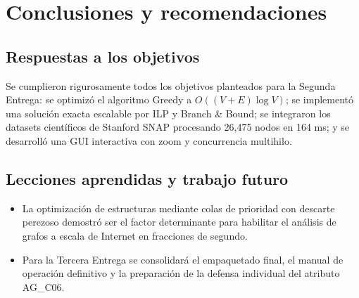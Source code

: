 \documentclass[11pt,a4paper]{article}
\begin{document}
\section{Conclusiones y recomendaciones}
\label{sec:conclusiones}

\subsection{Respuestas a los objetivos}
Se cumplieron rigurosamente todos los objetivos planteados para la Segunda Entrega: se optimizó el algoritmo Greedy a $O((V+E)\log V)$; se implementó una solución exacta escalable por ILP y Branch \& Bound; se integraron los datasets científicos de Stanford SNAP procesando 26,475 nodos en 164 ms; y se desarrolló una GUI interactiva con zoom y concurrencia multihilo.

\subsection{Lecciones aprendidas y trabajo futuro}
\begin{itemize}[itemsep=1pt]
	\item La optimización de estructuras mediante colas de prioridad con descarte perezoso demostró ser el factor determinante para habilitar el análisis de grafos a escala de Internet en fracciones de segundo.
	\item Para la Tercera Entrega se consolidará el empaquetado final, el manual de operación definitivo y la preparación de la defensa individual del atributo AG\_C06.
\end{itemize}

\end{document}
